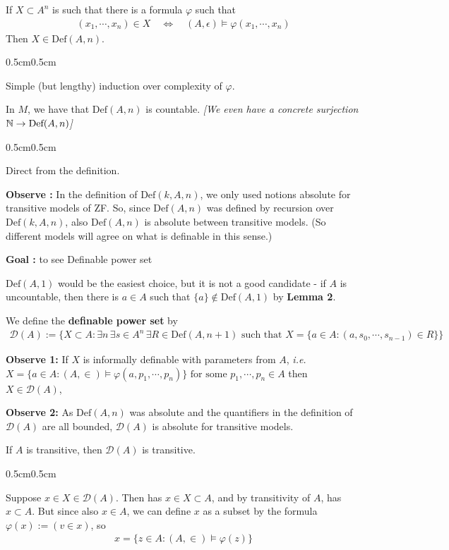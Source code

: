 \documentclass[12pt,a4paper]{article}
\newenvironment{proof}
{\begin{changemargin}{0.5cm}{0.5cm} 
	}%
	{\end{changemargin}
}
\newenvironment{p}
{\begin{proof} 
	}%
	{\end{proof}
}
\begin{document}
 If $X\subset A^n$ is such that there is a formula $\varphi$ such that
\begin{align*}
(x_1, \cdots, x_n) \in X \quad \Leftrightarrow \quad (A, \epsilon) \models \varphi(x_1, \cdots, x_n)
\end{align*}
Then $X\in \text{Def}(A,n)$.
\begin{p}
\pf Simple (but lengthy) induction over complexity of $\varphi$.
\end{p}
\s

 In $M$, we have that $\text{Def}(A,n)$ is countable. \emph{[We even have a concrete surjection $\mathbb{N}\rightarrow \textnormal{Def}(A,n)$]}
\begin{p}
\pf Direct from the definition.
\end{p}

\textbf{Observe :} In the definition of $\text{Def}(k, A, n)$, we only used notions absolute for transitive models of ZF. So, since $\text{Def}(A, n)$ was defined by recursion over $\text{Def}(k, A,n)$, also $\text{Def}(A,n)$ is absolute between transitive models. (So different models will agree on what is definable in this sense.)
\s

\textbf{Goal :} to see Definable power set

$\text{Def}(A, 1)$ would be the easiest choice, but it is not a good candidate - if $A$ is uncountable, then there is $a\in A$ such that $\{a\} \not\in \text{Def}(A, 1)$ by \textbf{Lemma 2}.
\s

 We define the \textbf{definable power set} by
\begin{align*}
\mathscr{D}(A) := \{X\subset A : \exists n \, \exists s \in A^n \, \exists R\in \text{Def}(A,n+1)\,\,\text{such that } X= \{a \in A : (a, s_0, \cdots, s_{n-1}) \in R \}\}
\end{align*}
\s

\textbf{Observe 1:} If $X$ is informally definable with parameters from $A$, \textit{i.e.} $X= \{a\in A : (A, \in) \models \varphi(a, p_1, \cdots, p_n) \} \text{ for some } p_1, \cdots, p_n \in A$ then $X\in \mathscr{D}(A)$,
\s

\textbf{Observe 2:} As $\text{Def}(A,n)$ was absolute and the quantifiers in the definition of $\mathscr{D}(A)$ are all bounded, $\mathscr{D}(A)$ is absolute for transitive models.
\s

\prop If $A$ is transitive, then $\mathscr{D}(A)$ is transitive.
\begin{p}
\pf Suppose $x\in X \in \mathscr{D}(A)$. Then has $x\in X \subset A$, and by transitivity of $A$, has $x\subset A$. But since also $x \in A$, we can define $x$ as a subset by the formula $\varphi(x) := (v\in x)$, so
\begin{align*}
x = \{z\in A : (A, \in) \models \varphi(z) \}
\end{align*}  
\eop
\end{p}
\s
\end{document}
